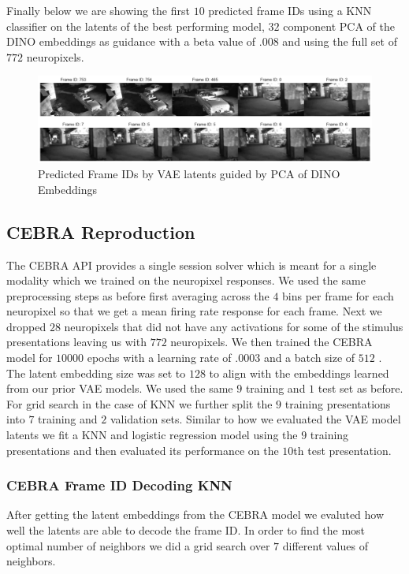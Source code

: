 \documentclass[12pt, letterpaper]{article}
\begin{document}
Finally below we are showing the first $10$ predicted frame IDs using a KNN classifier on the latents of the best performing model, $32$ component PCA of the DINO \cite{dino} embeddings as guidance with a beta value of $.008$ and using the full set of $772$ neuropixels.

\begin{figure}[H]
    \centering
    \includegraphics[width=1.0\textwidth]{772_vae_hidden_.9_pca_DINO_knn_video.png}
    \caption{Predicted Frame IDs by VAE latents guided by PCA of DINO Embeddings}
    \label{fig:vae_frame_id_decoded_video}
\end{figure}

\subsection{CEBRA Reproduction}
\label{subsec:cebra_reproduction}
The CEBRA API \cite{cebra_demo} provides a single session solver which is meant for a single modality which we trained on the neuropixel responses. We used the same preprocessing steps as before first averaging across the $4$ bins per frame for each neuropixel so that we get a mean firing rate response for each frame. Next we dropped $28$ neuropixels that did not have any activations for some of the stimulus presentations leaving us with $772$ neuropixels. We then trained the CEBRA \cite{schneider2023} model for $10000$ epochs with a learning rate of $.0003$ and a batch size of $512$ \cite{cebra_demo}. The latent embedding size was set to $128$ to align with the embeddings learned from our prior VAE models. We used the same $9$ training and $1$ test set as before. For grid search in the case of KNN we further split the $9$ training presentations into $7$ training and $2$ validation sets. Similar to how we evaluated the VAE model latents we fit a KNN and logistic regression model using the $9$ training presentations and then evaluated its performance on the $10$th test presentation.

\subsubsection{CEBRA Frame ID Decoding KNN}
\label{subsubsec:cebra_frame_id_decoding_knn}
After getting the latent embeddings from the CEBRA \cite{schneider2023} model we evaluted how well the latents are able to decode the frame ID. In order to find the most optimal number of neighbors we did a grid search over $7$ different values of neighbors. 
\end{document}
